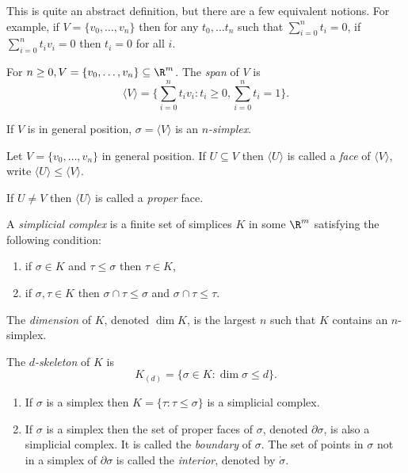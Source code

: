 \documentclass[a4paper]{article}
\renewcommand{\b}{\partial} %
\newcommand{\interior}{\mathring} %
\begin{document}
This is quite an abstract definition, but there are a few equivalent notions. For example, if \(V = \{v_0, \dots, v_n\}\) then for any \(t_0, \dots t_n\) such that \(\sum_{i = 0}^n t_i = 0\), if \(\sum_{i = 0}^n t_iv_i = 0\) then \(t_i = 0\) for all \(i\).

\begin{definition}[simplex]
  For \(n \geq 0, V = \{v_0, \dots, v_n\} \subseteq \R^m\). The \emph{span} of \(V\) is
  \[
    \langle V \rangle = \{\sum_{i = 0}^n t_iv_i: t_i \geq 0, \sum_{i = 0}^n t_i = 1\}.
  \]

  If \(V\) is in general position, \(\sigma = \langle V \rangle\) is an \emph{\(n\)-simplex}.
\end{definition}

\begin{definition}[face]
  Let \(V = \{v_0, \dots, v_n\}\) in general position. If \(U \subseteq V\) then \(\langle U \rangle\) is called a \emph{face} of \(\langle V\rangle\), write \(\langle U \rangle \leq \langle V \rangle\).

  If \(U \neq V\) then \(\langle U\rangle\) is called a \emph{proper} face.
\end{definition}

\begin{definition}
  A \emph{simplicial complex} is a finite set of simplices \(K\) in some \(\R^m\) satisfying the following condition:
  \begin{enumerate}
  \item if \(\sigma \in K\) and \(\tau \leq \sigma\) then \(\tau \in K\),
  \item if \(\sigma, \tau \in K\) then \(\sigma \cap \tau \leq \sigma\) and \(\sigma \cap \tau \leq \tau\).
  \end{enumerate}

  The \emph{dimension} of \(K\), denoted \(\dim K\), is the largest \(n\) such that \(K\) contains an \(n\)-simplex.

  The \emph{\(d\)-skeleton} of \(K\) is
  \[
    K_{(d)} = \{\sigma \in K: \dim \sigma \leq d\}.
  \]
\end{definition}

\begin{eg}\leavevmode
  \begin{enumerate}
  \item If \(\sigma\) is a simplex then \(K = \{\tau: \tau \leq \sigma\}\) is a simplicial complex.
  \item If \(\sigma\) is a simplex then the set of proper faces of \(\sigma\), denoted \(\b \sigma\), is also a simplicial complex. It is called the \emph{boundary} of \(\sigma\). The set of points in \(\sigma\) not in a simplex of \(\b \sigma\) is called the \emph{interior}, denoted by \(\interior \sigma\).
  \end{enumerate}
\end{eg}
\end{document}
